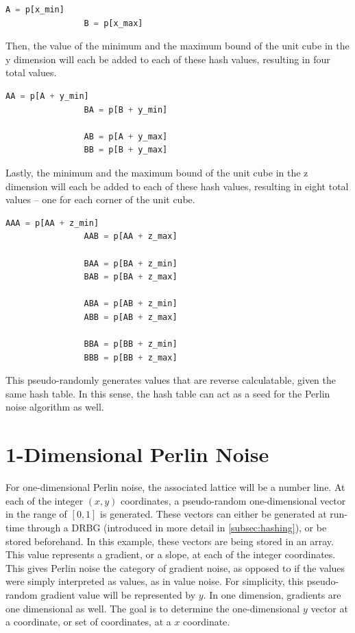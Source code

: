 \documentclass[10pt]{report}
\begin{document}
			\begin{lstlisting}[label={lst:hashx}, language=Python, frame=none]
				A = p[x_min]
				B = p[x_max]
			\end{lstlisting}
			
			Then, the value of the minimum and the maximum bound of the unit cube in the y dimension will each be added to each of these hash values, resulting in four total values. 
			
			\begin{lstlisting}[label={lst:hashx}, language=Python, frame=none]
				AA = p[A + y_min]
				BA = p[B + y_min]
				
				AB = p[A + y_max]
				BB = p[B + y_max]
			\end{lstlisting}
			
			Lastly, the minimum and the maximum bound of the unit cube in the z dimension will each be added to each of these hash values, resulting in eight total values -- one for each corner of the unit cube. 
			
			\begin{lstlisting}[label={lst:hashx}, language=Python, frame=none]
				AAA = p[AA + z_min]
				AAB = p[AA + z_max]
				
				BAA = p[BA + z_min]
				BAB = p[BA + z_max]
				
				ABA = p[AB + z_min]
				ABB = p[AB + z_max]
				
				BBA = p[BB + z_min]
				BBB = p[BB + z_max]
			\end{lstlisting}
		
			This pseudo-randomly generates values that are reverse calculatable, given the same hash table. In this sense, the hash table can act as a seed for the Perlin noise algorithm as well. 
	
		\section{1-Dimensional Perlin Noise} \label{sec:1d}
		
			For one-dimensional Perlin noise, the associated lattice will be a number line. At each of the integer \((x,y)\) coordinates, a pseudo-random one-dimensional vector in the range of \([0,1]\) is generated. These vectors can either be generated at run-time through a DRBG (introduced in more detail in \autoref{subsec:hashing}), or be stored beforehand. In this example, these vectors are being stored in an array. This value represents a gradient, or a slope, at each of the integer coordinates. This gives Perlin noise the category of gradient noise, as opposed to if the values were simply interpreted as values, as in value noise. For simplicity, this pseudo-random gradient value will be represented by \(y\). In one dimension, gradients are one dimensional as well. The goal is to determine the one-dimensional \(y\) vector at a coordinate, or set of coordinates, at a \(x\) coordinate. 
			
\end{document}
